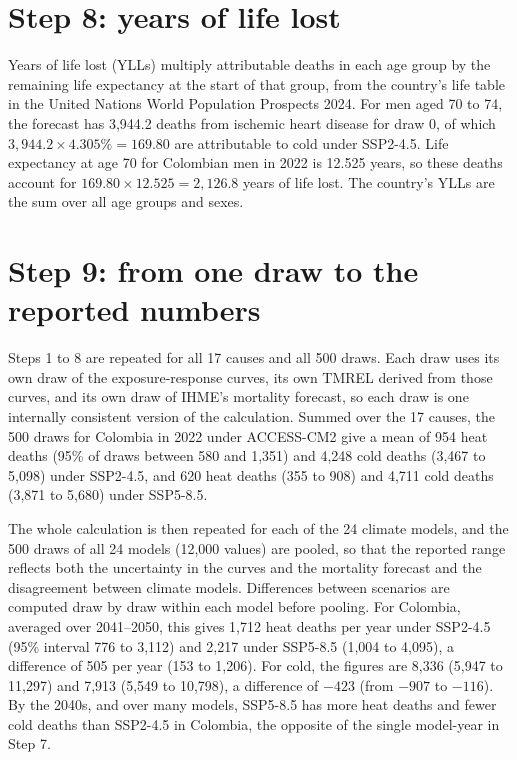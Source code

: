 \documentclass[11pt]{ozreport}
\begin{document}
\section{Step 8: years of life lost}

Years of life lost (YLLs) multiply attributable deaths in each age group by the remaining life expectancy at the start of that group, from the country's life table in the United Nations World Population Prospects 2024. For men aged 70 to 74, the forecast has 3,944.2 deaths from ischemic heart disease for draw 0, of which $3{,}944.2 \times 4.305\% = 169.80$ are attributable to cold under SSP2-4.5. Life expectancy at age 70 for Colombian men in 2022 is 12.525 years, so these deaths account for $169.80 \times 12.525 = 2{,}126.8$ years of life lost. The country's YLLs are the sum over all age groups and sexes.

\section{Step 9: from one draw to the reported numbers}

Steps 1 to 8 are repeated for all 17 causes and all 500 draws. Each draw uses its own draw of the exposure-response curves, its own TMREL derived from those curves, and its own draw of IHME's mortality forecast, so each draw is one internally consistent version of the calculation. Summed over the 17 causes, the 500 draws for Colombia in 2022 under ACCESS-CM2 give a mean of 954 heat deaths (95\% of draws between 580 and 1,351) and 4,248 cold deaths (3,467 to 5,098) under SSP2-4.5, and 620 heat deaths (355 to 908) and 4,711 cold deaths (3,871 to 5,680) under SSP5-8.5.

The whole calculation is then repeated for each of the 24 climate models, and the 500 draws of all 24 models (12,000 values) are pooled, so that the reported range reflects both the uncertainty in the curves and the mortality forecast and the disagreement between climate models. Differences between scenarios are computed draw by draw within each model before pooling. For Colombia, averaged over 2041--2050, this gives 1,712 heat deaths per year under SSP2-4.5 (95\% interval 776 to 3,112) and 2,217 under SSP5-8.5 (1,004 to 4,095), a difference of 505 per year (153 to 1,206). For cold, the figures are 8,336 (5,947 to 11,297) and 7,913 (5,549 to 10,798), a difference of $-423$ (from $-907$ to $-116$). By the 2040s, and over many models, SSP5-8.5 has more heat deaths and fewer cold deaths than SSP2-4.5 in Colombia, the opposite of the single model-year in Step 7.
\end{document}

